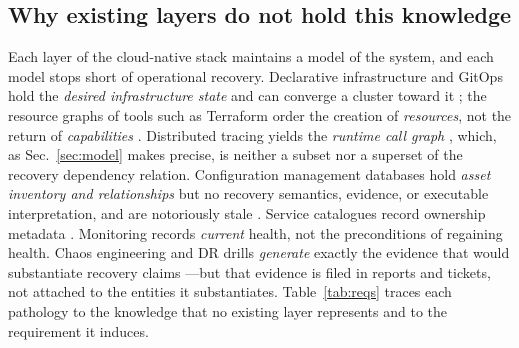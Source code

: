 \subsection{Why existing layers do not hold this knowledge}
\label{sec:gap}

Each layer of the cloud-native stack maintains a model of the system, and each model stops short of operational recovery. Declarative infrastructure and GitOps hold the \emph{desired infrastructure state} and can converge a cluster toward it \citep{morris2020iac,argocd}; the resource graphs of tools such as Terraform order the creation of \emph{resources}, not the return of \emph{capabilities} \citep{terraformgraph}. Distributed tracing yields the \emph{runtime call graph} \citep{sigelman2010dapper,luo2021characterizing}, which, as Sec.~\ref{sec:model} makes precise, is neither a subset nor a superset of the recovery dependency relation. Configuration management databases hold \emph{asset inventory and relationships} but no recovery semantics, evidence, or executable interpretation, and are notoriously stale \citep{itil2019}. Service catalogues record ownership metadata \citep{backstage}. Monitoring records \emph{current} health, not the preconditions of regaining health. Chaos engineering and DR drills \emph{generate} exactly the evidence that would substantiate recovery claims \citep{basiri2016chaos,rosenthal2020chaos,krishnan2012weathering}---but that evidence is filed in reports and tickets, not attached to the entities it substantiates. Table~\ref{tab:reqs} traces each pathology to the knowledge that no existing layer represents and to the requirement it induces.


